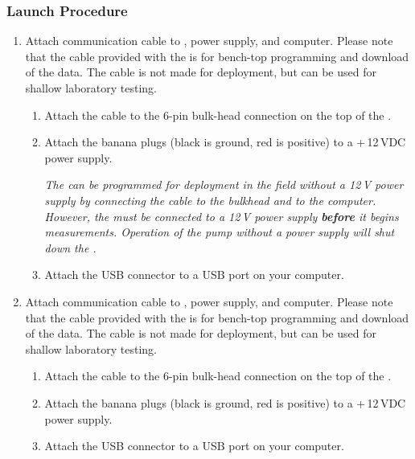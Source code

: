\subsubsection{\instType{} Launch Procedure}

\begin{enumerate}

\ifcase \inst	%

    \item Attach communication cable to \instType{}, power supply, and computer. Please note that the cable provided with the \instType{} is for bench-top programming and download of the \instType{} data.  The cable is not made for deployment, but can be used for shallow laboratory testing.
    
        \begin{enumerate}
        \item Attach the cable to the 6-pin bulk-head connection on the top of the \instType{}.
        \item Attach the banana plugs (black is ground, red is positive) to a +\,12\,VDC power supply.

        \textit{The \instType{} can be programmed for deployment in the field without a 12\,V power supply by connecting the cable to the bulkhead and to the computer.  However, the \instType{} must be connected to a 12\,V power supply \textbf{before} it begins measurements. Operation of the pump without a power supply will shut down the \instType{}.}
        
        \item Attach the USB connector to a USB port on your computer.
        \end{enumerate}
        
\or			%

    \item Attach communication cable to \instType{}, power supply, and computer. Please note that the cable provided with the \instType{} is for bench-top programming and download of the \instType{} data.  The cable is not made for deployment, but can be used for shallow laboratory testing.
    
        \begin{enumerate}
        \item Attach the cable to the 6-pin bulk-head connection on the top of the \instType{}.
        \item Attach the banana plugs (black is ground, red is positive) to a +\,12\,VDC power supply.
        \item Attach the USB connector to a USB port on your computer.
        \end{enumerate}
        

\end{enumerate}
